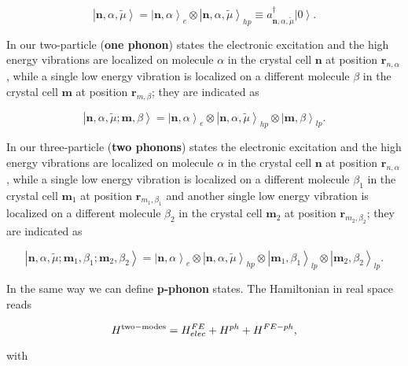 \documentclass[pt12]{article}
\newcommand{\bfn}{\mathbf{n}}
\newcommand{\bfm}{\mathbf{m}}
\newcommand{\tmu}{\tilde{\mu}}
\begin{document}
\begin{equation}\label{0P_states}
\left|\textbf{n},\alpha, \tmu \right>=\left|\textbf{n},\alpha
\right>_e \otimes \left| \textbf{n},\alpha, \tmu \right>_{hp} \equiv a^\dagger_{\bfn,\alpha,\tmu} \left|0\right>.
\end{equation}

In our two-particle (\textbf{one phonon}) states the electronic excitation and the high energy vibrations are localized on molecule $\alpha$ in the crystal cell $\bfn$ at position $\textbf{r}_{n,\alpha}$, while a single low energy vibration is localized on a different molecule $\beta$ in the crystal cell $\bfm$ at position $\textbf{r}_{m,\beta}$; they are indicated as

\begin{equation}\label{1P_states}
\left|\textbf{n},\alpha, \tmu ; \textbf{m},\beta
\right>=\left|\textbf{n},\alpha \right>_e \otimes \left|
\textbf{n},\alpha, \tmu \right>_{hp} \otimes \left| \textbf{m},\beta
\right>_{lp}.
\end{equation}

In our three-particle (\textbf{two phonons}) states the electronic excitation and the high energy vibrations are localized on molecule $\alpha$ in the crystal cell $\bfn$ at position $\textbf{r}_{n,\alpha}$, while a single low energy vibration is localized on a different molecule $\beta_1$ in the crystal cell $\bfm_1$ at position $\textbf{r}_{m_1,\beta_1}$ and another single low energy vibration is localized on a different molecule $\beta_2$
in the crystal cell $\bfm_2$ at position $\textbf{r}_{m_2,\beta_2}$; they are indicated as

\begin{equation}\label{2P_states}
\left|\textbf{n},\alpha, \tmu ; \textbf{m}_1,\beta_1;
\textbf{m}_2,\beta_2 \right>=\left|\textbf{n},\alpha \right>_e
\otimes \left| \textbf{n},\alpha, \tmu \right>_{hp} \otimes \left|
\textbf{m}_1,\beta_1 \right>_{lp} \otimes \left|
\textbf{m}_2,\beta_2 \right>_{lp}.
\end{equation}

In the same way we can define \textbf{p-phonon} states. The
Hamiltonian in real space reads

\begin{equation}\label{H}
H^{\rm two-modes}=H^{FE}_{elec}+H^{ph}+H^{FE-ph},
\end{equation}

with
\end{document}
